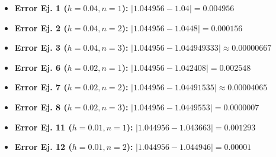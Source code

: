 \documentclass{article}
\begin{document}
\begin{itemize}
    \item \textbf{Error Ej. 1 ($h=0.04, n=1$):} $|1.044956 - 1.04| = 0.004956$
    \item \textbf{Error Ej. 2 ($h=0.04, n=2$):} $|1.044956 - 1.0448| = 0.000156$
    \item \textbf{Error Ej. 3 ($h=0.04, n=3$):} $|1.044956 - 1.044949333| \approx 0.00000667$
    \item \textbf{Error Ej. 6 ($h=0.02, n=1$):} $|1.044956 - 1.042408| = 0.002548$
    \item \textbf{Error Ej. 7 ($h=0.02, n=2$):} $|1.044956 - 1.04491535| \approx 0.00004065$
    \item \textbf{Error Ej. 8 ($h=0.02, n=3$):} $|1.044956 - 1.0449553| = 0.0000007$
    \item \textbf{Error Ej. 11 ($h=0.01, n=1$):} $|1.044956 - 1.043663| = 0.001293$
    \item \textbf{Error Ej. 12 ($h=0.01, n=2$):} $|1.044956 - 1.044946| = 0.00001$
\end{itemize}
\end{document}
